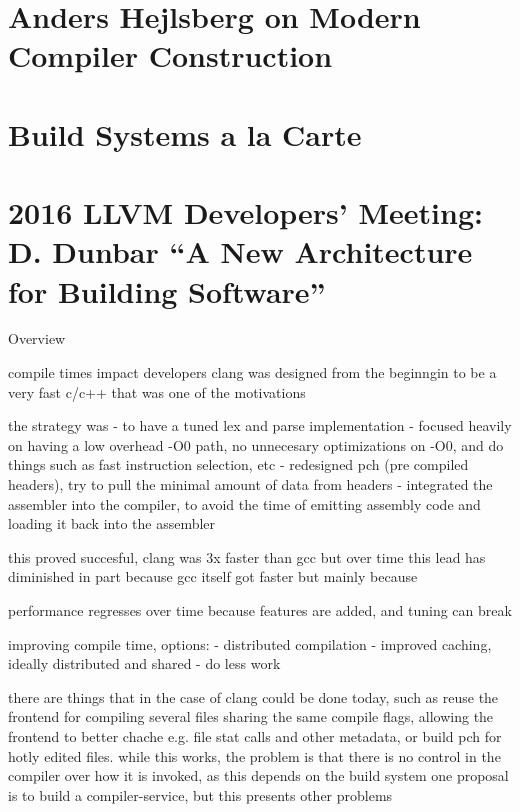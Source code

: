 \section*{Anders Hejlsberg on Modern Compiler Construction}

\cite{hejlsberg_modern_compiler_construction}

\section*{Build Systems a la Carte}

\cite{mokhov2018build}

\section*{2016 LLVM Developers’ Meeting: D. Dunbar “A New Architecture for Building Software”}

\cite{dunbar2016}

Overview

compile times impact developers
clang was designed from the beginngin to be a very fast c/c++
that was one of the motivations

the strategy was
- to have a tuned lex and parse implementation
- focused heavily on having a low overhead -O0 path, no unnecesary optimizations on -O0, and do things such as fast instruction selection, etc
- redesigned pch (pre compiled headers), try to pull the minimal amount of data from headers
- integrated the assembler into the compiler, to avoid the time of emitting assembly code and loading it back into the assembler

this proved succesful, clang was 3x faster than gcc
but over time this lead has diminished
in part because gcc itself got faster but mainly because

performance regresses over time because features are added, and tuning can break

improving compile time, options:
- distributed compilation
- improved caching, ideally distributed and shared
- do less work

there are things that in the case of clang could be done today, such as reuse the frontend for compiling several files sharing the same compile flags, allowing the frontend to better chache e.g. file stat calls and other metadata, or build pch for hotly edited files.
while this works, the problem is that there is no control in the compiler over how it is invoked, as this depends on the build system
one proposal is to build a compiler-service, but this presents other problems

